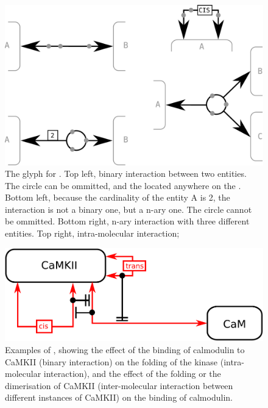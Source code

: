 \begin{figure}[H]
  \centering
  \includegraphics[scale = 0.3]{images/interaction}
  \caption{The \ER glyph for . Top left, binary interaction between two entities. The circle can be ommitted, and the  located anywhere on the . Bottom left, because the cardinality of the entity A is 2, the interaction is not a binary one, but a n-ary one. The circle cannot be ommitted. Bottom right, n-ary interaction with three different entities. Top right, intra-molecular interaction; }
  \label{fig:interaction}
\end{figure}

\begin{figure}[H]
  \centering
  \includegraphics[scale = 0.5]{examples/ex-interaction}
  \caption{Examples of , showing the effect of the binding of calmodulin to CaMKII (binary interaction) on the folding of the kinase (intra-molecular interaction), and the effect of the folding or the dimerisation of CaMKII (inter-molecular interaction between different instances of CaMKII) on the binding of calmodulin.}
  \label{fig:ex-interaction}
\end{figure}

